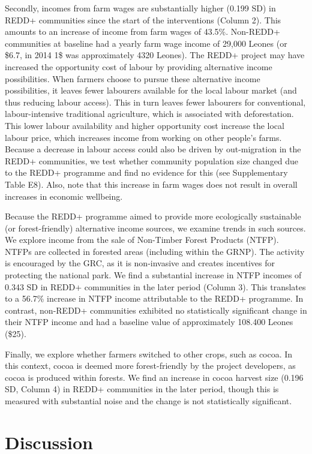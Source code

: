 \documentclass[
]{article}
\begin{document}
Secondly, incomes from farm wages are substantially higher (0.199 SD) in
REDD+ communities since the start of the interventions (Column 2). This
amounts to an increase of income from farm wages of 43.5\%. Non-REDD+
communities at baseline had a yearly farm wage income of 29,000 Leones
(or \$6.7, in 2014 1\$ was approximately 4320 Leones). The REDD+ project
may have increased the opportunity cost of labour by providing
alternative income possibilities. When farmers choose to pursue these
alternative income possibilities, it leaves fewer labourers available
for the local labour market (and thus reducing labour access). This in
turn leaves fewer labourers for conventional, labour-intensive
traditional agriculture, which is associated with deforestation. This
lower labour availability and higher opportunity cost increase the local
labour price, which increases income from working on other people's
farms. Because a decrease in labour access could also be driven by
out-migration in the REDD+ communities, we test whether community
population size changed due to the REDD+ programme and find no evidence
for this (see Supplementary Table E8). Also, note that this increase in
farm wages does not result in overall increases in economic wellbeing.

Because the REDD+ programme aimed to provide more ecologically
sustainable (or forest-friendly) alternative income sources, we examine
trends in such sources. We explore income from the sale of Non-Timber
Forest Products (NTFP). NTFPs are collected in forested areas (including
within the GRNP). The activity is encouraged by the GRC, as it is
non-invasive and creates incentives for protecting the national park. We
find a substantial increase in NTFP incomes of 0.343 SD in REDD+
communities in the later period (Column 3). This translates to a 56.7\%
increase in NTFP income attributable to the REDD+ programme. In
contrast, non-REDD+ communities exhibited no statistically significant
change in their NTFP income and had a baseline value of approximately
108.400 Leones (\$25).

Finally, we explore whether farmers switched to other crops, such as
cocoa. In this context, cocoa is deemed more forest-friendly by the
project developers, as cocoa is produced within forests. We find an
increase in cocoa harvest size (0.196 SD, Column 4) in REDD+ communities
in the later period, though this is measured with substantial noise and
the change is not statistically significant.

\hypertarget{discussion}{%
\section{Discussion}\label{discussion}}
\end{document}
